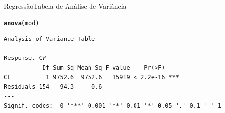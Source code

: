 \documentclass[10pt]{beamer}\usepackage[]{graphicx}\usepackage[]{color}
\makeatletter
\newcommand{\hlstd}[1]{\textcolor[rgb]{0.345,0.345,0.345}{#1}}%
\newcommand{\hlkwd}[1]{\textcolor[rgb]{0.737,0.353,0.396}{\textbf{#1}}}%
\newenvironment{kframe}{%
 \def\at@end@of@kframe{}%
 \ifinner\ifhmode%
  \def\at@end@of@kframe{\end{minipage}}%
  \begin{minipage}{\columnwidth}%
 \fi\fi%
 \def\FrameCommand##1{\hskip\@totalleftmargin \hskip-\fboxsep
 \colorbox{shadecolor}{##1}\hskip-\fboxsep
     \hskip-\linewidth \hskip-\@totalleftmargin \hskip\columnwidth}%
 \MakeFramed {\advance\hsize-\width
   \@totalleftmargin\z@ \linewidth\hsize
   \@setminipage}}%
 {\par\unskip\endMakeFramed%
 \at@end@of@kframe}
\newenvironment{knitrout}{}{} %
\theoremstyle{definition}
\makeatother
\begin{document}
\begin{frame}[fragile]{Regressão}{Tabela de Análise de Variância}
\begin{knitrout}\footnotesize
{}\color{fgcolor}\begin{kframe}
\begin{alltt}
\hlkwd{anova}\hlstd{(mod)}
\end{alltt}
\begin{verbatim}
Analysis of Variance Table

Response: CW
           Df Sum Sq Mean Sq F value    Pr(>F)    
CL          1 9752.6  9752.6   15919 < 2.2e-16 ***
Residuals 154   94.3     0.6                      
---
Signif. codes:  0 '***' 0.001 '**' 0.01 '*' 0.05 '.' 0.1 ' ' 1
\end{verbatim}
\end{kframe}
\end{knitrout}
\end{frame}
\end{document}
